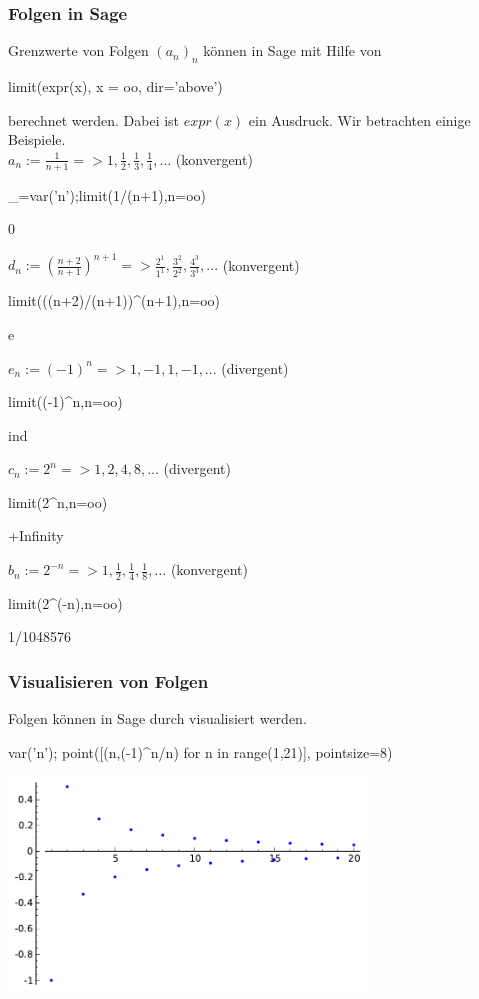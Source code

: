 \documentclass[fontsize=12pt,paper=a4,twoside,bibtotoc,idxtotoc,
liststotoc,pagesize,BCOR1.2cm,DIV15,chapterprefix,pagesize=pdftex]{scrbook}
\theoremstyle{plain}
\theoremstyle{definition}
\theoremstyle{remark}
\begin{document}
\subsubsection{Folgen in Sage}
Grenzwerte von Folgen $(a_n)_n$ können in Sage mit Hilfe von 
\begin{sagein}
limit(expr(x), x = oo, dir='above')
\end{sagein}
berechnet werden. Dabei ist $expr(x)$ ein Ausdruck.
Wir betrachten einige Beispiele.\\
$a_n:= \frac{1}{n+1} => 1, \frac{1}{2}, \frac{1}{3}, \frac{1}{4}, \ldots$  (konvergent)
\begin{sagein}
_=var('n');limit(1/(n+1),n=oo)
\end{sagein}
\begin{sageout}
  0
\end{sageout}
 $d_n:=\left( \frac{n+2}{n+1} \right)^{n+1} => \frac{2^1}{1^1},\frac{3^2}{2^2}, \frac{4^3}{3^3},...$ (konvergent)
\begin{sagein}
limit(((n+2)/(n+1))^(n+1),n=oo)
\end{sagein}
\begin{sageout}
  e
\end{sageout}
 $e_n:=(-1)^n => 1,-1,1,-1,...$ (divergent)
\begin{sagein}
limit((-1)^n,n=oo)
\end{sagein}
\begin{sageout}
  ind
\end{sageout}
 $c_n:=2^n => 1,2,4,8,\ldots$ (divergent)
\begin{sagein}
limit(2^n,n=oo)
\end{sagein}
\begin{sageout}
  +Infinity
\end{sageout}
  $b_n:= 2^{-n} => 1,\frac{1}{2}, \frac{1}{4}, \frac{1}{8}, \ldots$ (konvergent)
\begin{sagein}
limit(2^(-n),n=oo)
\end{sagein}
\begin{sageout}
  1/1048576
\end{sageout}
\subsubsection{Visualisieren von Folgen}
Folgen können in Sage durch {\color{blue} } visualisiert werden.
\begin{sagein}
var('n');
point([(n,(-1)^n/n) for n in range(1,21)], pointsize=8)
\end{sagein}
\begin{center}
\includegraphics[width=9.5cm]{folge.pdf}
\end{center}
\end{document}
